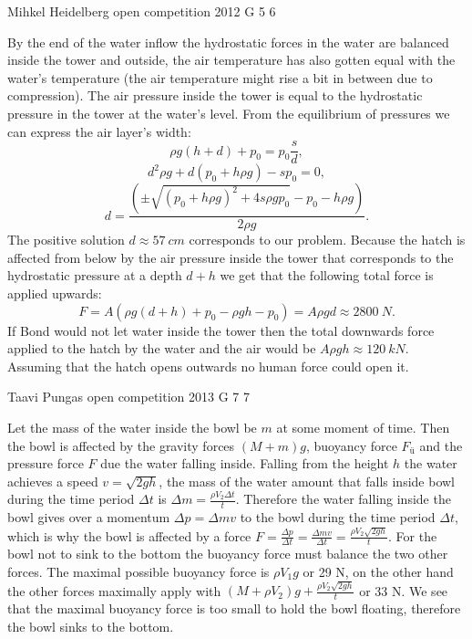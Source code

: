\documentclass[11pt]{article}
\begin{document}
{Mihkel Heidelberg} %
{open competition} %
{2012} %
{G 5} %
{6} %
{

\ifEngSolution
By the end of the water inflow the hydrostatic forces in the water are balanced inside the tower and outside, the air temperature has also gotten equal with the water’s temperature (the air temperature might rise a bit in between due to compression). The air pressure inside the tower is equal to the hydrostatic pressure in the tower at the water’s level. From the equilibrium of pressures we can express the air layer’s width:
$$ \rho g (h+d) + p_0 = p_0 \frac{s}{d},$$
$$ d^2 \rho g  + d (p_0 + h \rho g) - s p_0=0, $$
$$ d = \frac{( \pm \sqrt{(p_0 + h \rho g)^2 + 4 s \rho g p_0 } - p_0 - h \rho g)}{2\rho g }.$$
The positive solution $d \approx \SI{57}{cm}$ corresponds to our problem. Because the hatch is affected from below by the air pressure inside the tower that corresponds to the hydrostatic pressure at a depth $d+h$ we get that the following total force is applied upwards:
$$F = A(\rho g (d+h) + p_0 - \rho g h - p_0) = A \rho g d \approx \SI{2800}{N}.  $$
If Bond would not let water inside the tower then the total downwards force applied to the hatch by the water and the air would be $A \rho g h \approx \SI{120}{kN}$. Assuming that the hatch opens outwards no human force could open it.
\fi
}

{Taavi Pungas} %
{open competition} %
{2013} %
{G 7} %
{7} %
{

\ifEngSolution
Let the mass of the water inside the bowl be $m$ at some moment of time. Then the bowl is affected by the gravity forces $(M+m)g$, buoyancy force $F_{ü}$ and the pressure force $F$ due the water falling inside. Falling from the height $h$ the water achieves a speed $v=\sqrt{2gh}$, the mass of the water amount that falls inside bowl during the time period $\Delta t$ is $\Delta m = \frac{\rho V_2 \Delta t}{t}$. Therefore the water falling inside the bowl gives over a momentum $\Delta p =\Delta m v$ to the bowl during the time period $\Delta t$, which is why the bowl is affected by a force $F=\frac{\Delta p}{\Delta t}=\frac{\Delta m v}{\Delta t}=\frac{\rho V_2 \sqrt{2gh}}{t}$. For the bowl not to sink to the bottom the buoyancy force must balance the two other forces. The maximal possible buoyancy force is $\rho V_1 g$ or 29 N, on the other hand the other forces maximally apply with $(M+\rho V_2)g + \frac{\rho V_2 \sqrt{2gh}}{t}$ or 33 N. We see that the maximal buoyancy force is too small to hold the bowl floating, therefore the bowl sinks to the bottom.
\fi
}
\end{document}

